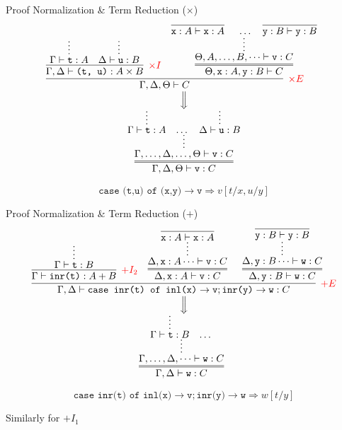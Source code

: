 \documentclass{beamer}
\newcommand{\term}[1]{\texttt{#1}}
\begin{document}
\begin{frame}{Proof Normalization \& Term Reduction ($\times$)}
	\small 
	\[
	\begin{array}{c}
		\infer[\textcolor{red}{\times E}]{\Gamma, \Delta, \Theta \vdash C}{
			\infer[\textcolor{red}{\times I}]{\Gamma, \Delta \vdash \term{(t, u)}: A \times B}{
				\infer*[]{\Gamma \vdash \term{t}: A}{}
				&
				\infer*[]{\Delta \vdash \term{u}: B}{}
			}
			&
			\infer=[]{\Theta, \term{x}: A, \term{y}: B \vdash C}{
				\infer*[]{\Theta, A, \dots, B, \dots \vdash \term{v}: C}{
				\infer[]{\term{x}: A \vdash \term{x}: A}{}
				& 
				\dots
				&
				\infer[]{\term{y}: B \vdash \term{y}: B}{}
				}
			}
		}
		\\
		{\left\Downarrow\vbox to 1em{}\right.\kern-\nulldelimiterspace}\\
		\infer=[]{\Gamma, \Delta, \Theta \vdash \term{v}: C}{
			\infer*[]{\Gamma, \dots, \Delta, \dots, \Theta \vdash \term{v}: C}{
				\infer*[]{\Gamma \vdash \term{t}: A}{}
				&
				\dots
				&
				\infer*[]{\Delta \vdash \term{u}: B}{}
			}
		}
	\end{array}
	\]

	\alert{
	\[
		\term{case (t,u) of (x,y)}\to \term{v} \Longrightarrow v[t/x, u/y]
	\]
	}
\end{frame}

\begin{frame}{Proof Normalization \& Term Reduction ($+$)}
	\small
	\[
		\begin{array}{c}
			\infer[\textcolor{red}{+ E}]{\Gamma, \Delta \vdash \term{case inr(t) of inl(x)}\to\term{v}; \term{inr(y)}\to\term{w}: C}{
				\infer[\textcolor{red}{+ I_2}]{\Gamma \vdash \term{inr(t)}: A + B}{
					\infer*[]{\Gamma \vdash \term{t}: B}{}
				}
				&
				\infer=[]{\Delta, \term{x}: A \vdash \term{v}: C}{
					\infer*[]{\Delta, \term{x}: A \dots \vdash \term{v}: C}{
					\infer[]{\term{x}: A \vdash \term{x}: A}{}
					}
				}
				&
				\infer=[]{\Delta, \term{y}: B \vdash \term{w}: C}{
					\infer*[]{\Delta, \term{y}: B \dots \vdash \term{w}: C}{
						\infer[]{\term{y}: B \vdash \term{y}: B}{}
					}
				}
			}
			\\
			{\left\Downarrow\vbox to 1em{}\right.\kern-\nulldelimiterspace}\\
			\infer=[]{\Gamma, \Delta \vdash \term{w}: C}{
				\infer*[]{\Gamma, \dots, \Delta, \dots \vdash \term{w}: C}{
					\infer*[]{\Gamma \vdash \term{t}: B}{}
					&
					\dots
				}
			}
		\end{array}
	\]

	\alert{
	\[
		\term{case inr(t) of inl(x)}\to\term{v}; \term{inr(y)}\to\term{w} \Longrightarrow w[t/y]
	\]
	}

	\vfill
	\begin{flushright}
		Similarly for $+ I_1$
	\end{flushright}
\end{frame}
\end{document}

